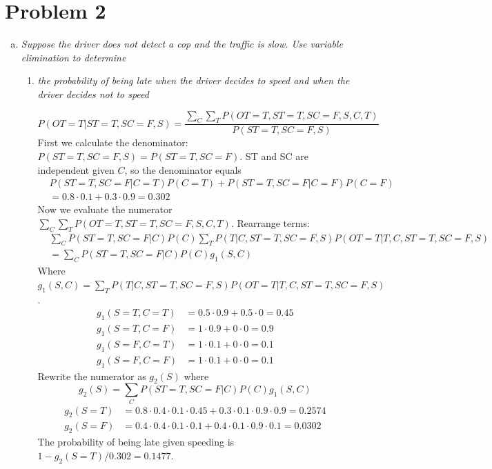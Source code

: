 \documentclass{article}
\begin{document}
\section{Problem 2}
\begin{enumerate}[(a)]
\item \textit{Suppose the driver does not detect a cop and the traffic
  is slow.  Use variable elimination to determine}


  \begin{enumerate}
  \item \textit{the probability of being late when the driver decides
    to speed and when the driver decides not to speed}

    $$P(OT=T|ST=T,SC=F,S)=\frac{\sum_C\sum_T P(OT=T,ST=T,SC=F,S,C,T)}{P(ST=T,SC=F,S)}$$
    First we calculate the denominator: $P(ST=T,SC=F,S)=P(ST=T,SC=F)$. ST and SC are 
    independent given $C$, so the denominator equals
    \begin{align*}
    &P(ST=T,SC=F|C=T)P(C=T)+P(ST=T,SC=F|C=F)P(C=F)\\
    &=0.8\cdot 0.1+0.3\cdot 0.9=0.302
    \end{align*}
    Now we evaluate the numerator $\sum_C\sum_T P(OT=T,ST=T,SC=F,S,C,T)$. 
    Rearrange terms:
    \begin{align*}
    &\sum_C P(ST=T,SC=F|C)P(C) \sum_T P(T|C,ST=T,SC=F,S)P(OT=T|T,C,ST=T,SC=F,S)\\ 
    &=\sum_C P(ST=T,SC=F|C)P(C) g_1(S,C) 
    \end{align*}
    Where $g_1(S,C)= \sum_T P(T|C,ST=T,SC=F,S)P(OT=T|T,C,ST=T,SC=F,S)$.
    \begin{align*}
    g_1(S=T,C=T)&=0.5\cdot 0.9+0.5\cdot 0=0.45\\
    g_1(S=T,C=F)&=1\cdot 0.9+0\cdot 0=0.9\\
    g_1(S=F,C=T)&=1\cdot 0.1+0\cdot 0=0.1\\
    g_1(S=F,C=F)&=1\cdot 0.1+0\cdot 0=0.1
    \end{align*}
    Rewrite the numerator as $g_2(S)$ where
    $$g_2(S)=\sum_C P(ST=T,SC=F|C)P(C)g_1(S,C)$$
    \begin{align*}
    g_2(S=T)&=0.8\cdot 0.4\cdot 0.1\cdot 0.45+0.3\cdot 0.1\cdot 0.9\cdot 0.9=0.2574\\
    g_2(S=F)&=0.4\cdot 0.4\cdot 0.1\cdot 0.1+0.4\cdot 0.1\cdot 0.9\cdot 0.1=0.0302
    \end{align*}
    The probability of being late given speeding is $1-g_2(S=T)/0.302=0.1477$.


\end{enumerate}
\end{enumerate}
\end{document}
